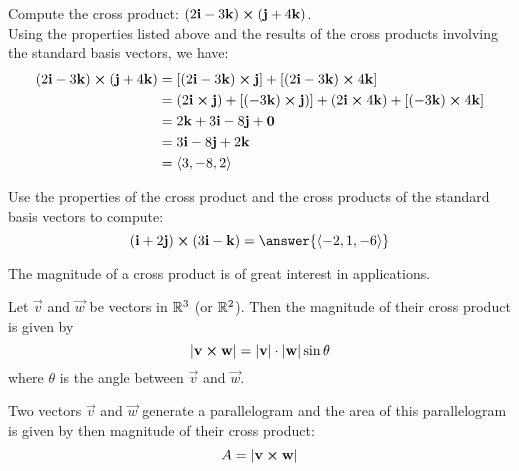 \documentclass[handout]{ximera}
\begin{document}
\begin{example}
Compute the cross product: $(2\mathbf{i} - 3\mathbf{k}) \boldsymbol\times (\mathbf{j} + 4\mathbf{k})$.\\
Using the properties listed above and the results of the cross products involving the standard basis vectors, we have:
\begin{align*}
(2\mathbf{i} - 3\mathbf{k}) \boldsymbol\times (\mathbf{j} + 4\mathbf{k}) & = [(2\mathbf{i} - 3\mathbf{k}) \boldsymbol\times \mathbf{j}] + [(2\mathbf{i} - 3\mathbf{k}) \boldsymbol\times   4\mathbf{k}]\\
                                  &= (2\mathbf{i} \boldsymbol\times \mathbf{j}) + [(-3\mathbf{k}) \boldsymbol\times \mathbf{j})] +(2\mathbf{i} \boldsymbol\times   4\mathbf{k}) + [ (- 3\mathbf{k}) \boldsymbol\times   4\mathbf{k}]\\
                                  &= 2\mathbf{k} + 3 \mathbf{i} -8\mathbf{j} + \mathbf{0}\\
                                  &= 3\mathbf{i} - 8\mathbf{j} +2\mathbf{k}\\
                                  &= \left\langle 3, -8, 2\right\rangle
\end{align*}
\end{example}

\begin{problem}
Use the properties of the cross product and the cross products of the standard basis vectors to compute: 
\[
(\vec{i} + 2\vec{j}) \cross (3\vec{i} - \vec{k}) = \answer{\vector{-2,1,-6}}
\]
\end{problem}



The magnitude of a cross product is of great interest in applications.
\begin{proposition}
Let $\vec{v}$ and $\vec{w}$ be vectors in $\mathbb R^3$ (or $\mathbb R^2$). Then the magnitude of their cross product is given by
\[
|\mathbf{v} \boldsymbol\times \mathbf{w}| = |\mathbf{v}| \cdot |\mathbf{w}| \sin \theta
\]
where $\theta$ is the angle between $\vec{v}$ and $\vec{w}$.
\end{proposition}

Two vectors $\vec{v}$ and $\vec{w}$ generate a parallelogram and the area of this parallelogram is given by then magnitude of their cross product:
\[
A = |\mathbf{v} \boldsymbol\times \mathbf{w}|
\]

\begin{image}
\end{image}
\end{document}
